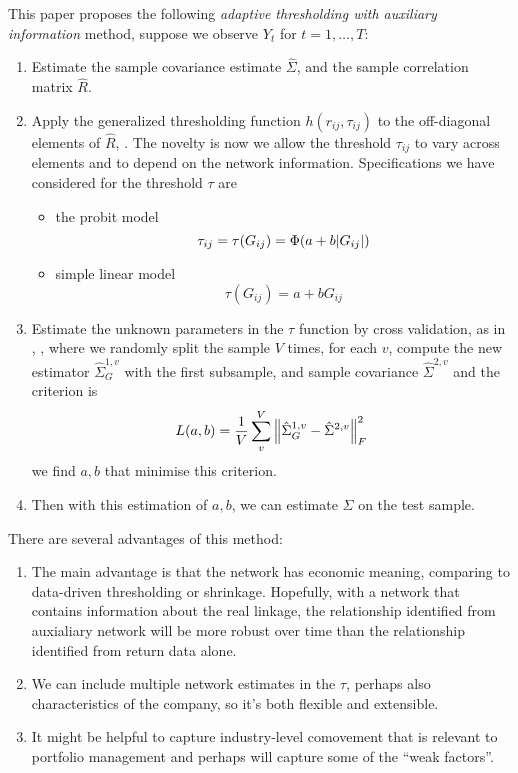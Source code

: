 This paper proposes the following \textit{adaptive thresholding with auxiliary information} method, suppose we observe \(Y_{t}\) for \(t = 1 ,\dots, T\):
\begin{enumerate}
    \item Estimate the sample covariance estimate \(\hat{\Sigma}\), and the sample correlation matrix \(\hat{R}\). 
    \item Apply the generalized thresholding function \(h(r_{ij},\tau_{ij})\) to the off-diagonal elements of \(\hat{R}\), \cite{rothman2009GeneralizedThresholding}. The novelty is now we allow the threshold \(\tau_{ij}\) to vary across elements and to depend on the network information.  Specifications we have considered for the threshold \(\tau\) are 
    \begin{itemize}
        \item 
        the probit model
            \begin{equation*}
            \tau_{ij} = \tau\pqty{G_{ij}} = \Phi\pqty{a + b \abs{G_{ij}}}
            \end{equation*}
        \item simple linear model 
            \begin{equation*}
                \tau(G_{ij}) = a + bG_{ij}
            \end{equation*}
    \end{itemize}
    \item Estimate the unknown parameters in the \(\tau\) function by cross validation, as in \cite{bickel2008CovarianceRegularization}, \cite{cai2011AdaptiveThresholding}, where we randomly split the sample \(V\) times, for each \(v\), compute the new estimator \(\hat{\Sigma}^{1,v}_{G}\) with the first subsample, and sample covariance \(\hat{\Sigma}^{2,v}\) and the criterion is 
    \begin{equation*}
        L(a, b) = \frac{1}{V} \sum_{v}^{V} \norm{\hat{\Sigma}^{1,v}_{G} - \hat{\Sigma}^{2,v}}^{2}_{F}
    \end{equation*}
    we find \(a,b\) that minimise this criterion. 
    
    \item Then with this estimation of \(a,b\), we can estimate \(\Sigma\) on the test sample. 
\end{enumerate}

There are several advantages of this method:
\begin{enumerate}
    \item The main advantage is that the network has economic meaning, comparing to data-driven thresholding or shrinkage. Hopefully, with a network that contains information about the real linkage, the relationship identified from auxialiary network will be more robust over time than the relationship identified from return data alone. 
    \item We can include multiple network estimates in the \(\tau\), perhaps also characteristics of the company, so it's both flexible and extensible.
    \item It might be helpful to capture industry-level comovement that is relevant to portfolio management and perhaps will capture some of the ``weak factors''.
\end{enumerate}

